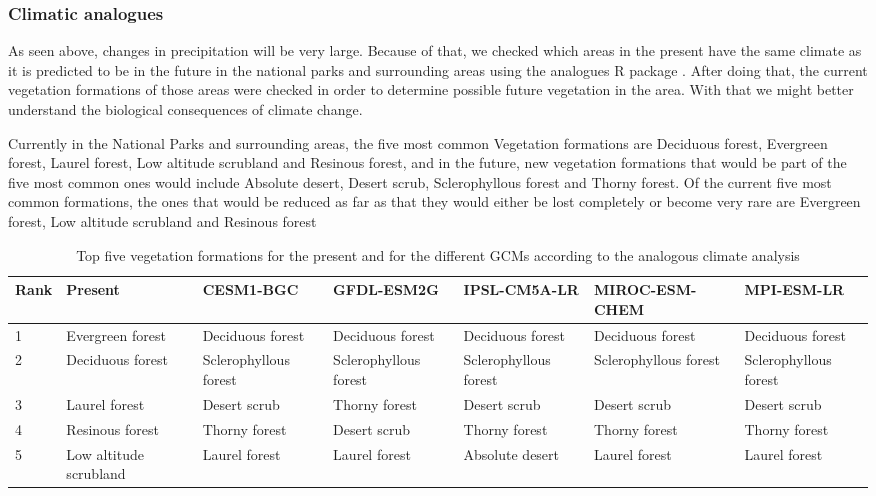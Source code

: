 \documentclass[]{article}
\begin{document}
\hypertarget{climatic-analogues}{%
\subsubsection{Climatic analogues}\label{climatic-analogues}}

As seen above, changes in precipitation will be very large. Because of that, we checked which areas in the present have the same climate as it is predicted to be in the future in the national parks and surrounding areas using the analogues R package \citep{ramirez2011climate}. After doing that, the current vegetation formations of those areas were checked in order to determine possible future vegetation in the area. With that we might better understand the biological consequences of climate change.

Currently in the National Parks and surrounding areas, the five most common Vegetation formations are Deciduous forest, Evergreen forest, Laurel forest, Low altitude scrubland and Resinous forest, and in the future, new vegetation formations that would be part of the five most common ones would include Absolute desert, Desert scrub, Sclerophyllous forest and Thorny forest. Of the current five most common formations, the ones that would be reduced as far as that they would either be lost completely or become very rare are Evergreen forest, Low altitude scrubland and Resinous forest

\begin{table}

\caption{\label{tab:TablaForm}Top five vegetation formations for the present and for the different GCMs according to the analogous climate analysis}
\centering
\fontsize{5}{7}\selectfont
\begin{tabular}[t]{lllllll}
\toprule
Rank & Present & CESM1-BGC & GFDL-ESM2G & IPSL-CM5A-LR & MIROC-ESM-CHEM & MPI-ESM-LR\\
\midrule
1 & Evergreen
forest & Deciduous
forest & Deciduous
forest & Deciduous
forest & Deciduous
forest & Deciduous
forest\\
2 & Deciduous
forest & Sclerophyllous
forest & Sclerophyllous
forest & Sclerophyllous
forest & Sclerophyllous
forest & Sclerophyllous
forest\\
3 & Laurel
forest & Desert
scrub & Thorny
forest & Desert
scrub & Desert
scrub & Desert
scrub\\
4 & Resinous
forest & Thorny
forest & Desert
scrub & Thorny
forest & Thorny
forest & Thorny
forest\\
5 & Low
altitude
scrubland & Laurel
forest & Laurel
forest & Absolute
desert & Laurel
forest & Laurel
forest\\
\bottomrule
\end{tabular}
\end{table}
\end{document}
